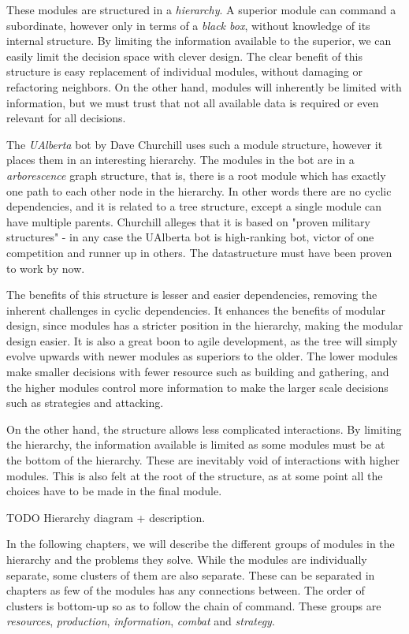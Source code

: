 These modules are structured in a \emph{hierarchy}. A superior module can command a subordinate, however only in terms of a \emph{black box}, without knowledge of its internal structure. By limiting the information available to the superior, we can easily limit the decision space with clever design. The clear benefit of this structure is easy replacement of individual modules, without damaging or refactoring neighbors. On the other hand, modules will inherently be limited with information, but we must trust that not all available data is required or even relevant for all decisions.

The \emph{UAlberta} bot by Dave Churchill uses such a module structure, however it places them in an interesting hierarchy. The modules in the bot are in a \emph{arborescence} graph structure, that is, there is a root module which has exactly one path to each other node in the hierarchy. In other words there are no cyclic dependencies, and it is related to a tree structure, except a single module can have multiple parents. Churchill alleges that it is based on "proven military structures" - in any case the UAlberta bot is high-ranking bot, victor of one competition and runner up in others. The datastructure must have been proven to work by now.

The benefits of this structure is lesser and easier dependencies, removing the inherent challenges in cyclic dependencies. It enhances the benefits of modular design, since modules has a stricter position in the hierarchy, making the modular design easier. It is also a great boon to agile development, as the tree will simply evolve upwards with newer modules as superiors to the older. The lower modules make smaller decisions with fewer resource such as building and gathering, and the higher modules control more information to make the larger scale decisions such as strategies and attacking.

On the other hand, the structure allows less complicated interactions. By limiting the hierarchy, the information available is limited as some modules must be at the bottom of the hierarchy. These are inevitably void of interactions with higher modules. This is also felt at the root of the structure, as at some point all the choices have to be made in the final module.

TODO Hierarchy diagram + description.

In the following chapters, we will describe the different groups of modules in the hierarchy and the problems they solve. While the modules are individually separate, some clusters of them are also separate. These can be separated in chapters as few of the modules has any connections between. The order of clusters is bottom-up so as to follow the chain of command. These groups are \emph{resources}, \emph{production}, \emph{information}, \emph{combat} and \emph{strategy}.

